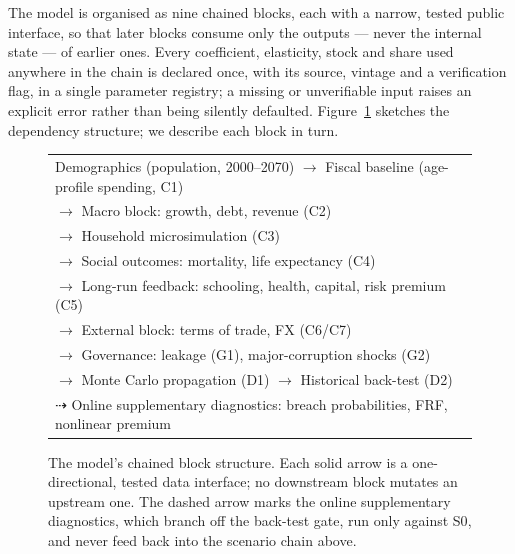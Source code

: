 \documentclass[11pt,a4paper]{article}
\begin{document}
The model is organised as nine chained blocks, each with a narrow, tested public interface, so that later blocks consume only the outputs --- never the internal state --- of earlier ones. Every coefficient, elasticity, stock and share used anywhere in the chain is declared once, with its source, vintage and a verification flag, in a single parameter registry; a missing or unverifiable input raises an explicit error rather than being silently defaulted. Figure~\ref{fig:chain} sketches the dependency structure; we describe each block in turn.

\begin{figure}[htbp]
\centering
\footnotesize
\begin{tabular}{@{}l@{}}
Demographics (population, 2000--2070) $\longrightarrow$ Fiscal baseline (age-profile spending, \textsc{C1}) \\
\hspace{3.0cm}$\longrightarrow$ Macro block: growth, debt, revenue (\textsc{C2}) \\
\hspace{6.0cm}$\longrightarrow$ Household microsimulation (\textsc{C3}) \\
\hspace{6.0cm}$\longrightarrow$ Social outcomes: mortality, life expectancy (\textsc{C4}) \\
\hspace{6.0cm}$\longrightarrow$ Long-run feedback: schooling, health, capital, risk premium (\textsc{C5}) \\
\hspace{6.0cm}$\longrightarrow$ External block: terms of trade, FX (\textsc{C6}/\textsc{C7}) \\
\hspace{3.0cm}$\longrightarrow$ Governance: leakage (\textsc{G1}), major-corruption shocks (\textsc{G2}) \\
\hspace{3.0cm}$\longrightarrow$ Monte Carlo propagation (\textsc{D1}) $\longrightarrow$ Historical back-test (\textsc{D2}) \\
\hspace{0.3cm}$\dashrightarrow$ Online supplementary diagnostics: breach probabilities, FRF, nonlinear premium
\end{tabular}
\caption{The model's chained block structure. Each solid arrow is a one-directional, tested data interface; no downstream block mutates an upstream one. The dashed arrow marks the online supplementary diagnostics, which branch off the back-test gate, run only against \textsc{S0}, and never feed back into the scenario chain above.}
\label{fig:chain}
\end{figure}
\end{document}

